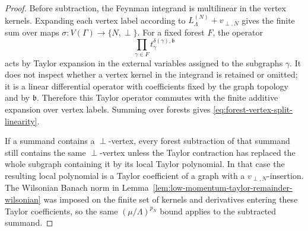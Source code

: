 \begin{proof}
Before subtraction, the Feynman integrand is multilinear in the vertex
kernels.  Expanding each vertex label according to
\(L_\Lambda^{(N)}+v_{\perp,N}\) gives the finite sum over maps
\(\sigma:V(\Gamma)\to\{N,\perp\}\).  For a fixed forest \(F\), the operator
\[
  \prod_{\gamma\in F}t_\gamma^{\delta(\gamma),\mathfrak b}
\]
acts by Taylor expansion in the external variables assigned to the subgraphs
\(\gamma\).  It does not inspect whether a vertex kernel in the integrand is
retained or omitted; it is a linear differential operator with coefficients
fixed by the graph topology and by \(\mathfrak b\).  Therefore this Taylor
operator commutes with the finite additive expansion over vertex labels.
Summing over forests gives \eqref{eq:forest-vertex-split-linearity}.

If a summand contains a \(\perp\)-vertex, every forest subtraction of that
summand still contains the same \(\perp\)-vertex unless the Taylor contraction
has replaced the whole subgraph containing it by its local Taylor polynomial.
In that case the resulting local polynomial is a Taylor coefficient of a graph
with a \(v_{\perp,N}\)-insertion.  The Wilsonian Banach norm in
Lemma~\ref{lem:low-momentum-taylor-remainder-wilsonian} was imposed on the
finite set of kernels and derivatives entering these Taylor coefficients, so
the same \((\mu/\Lambda)^{p_N}\) bound applies to the subtracted summand.
\end{proof}

